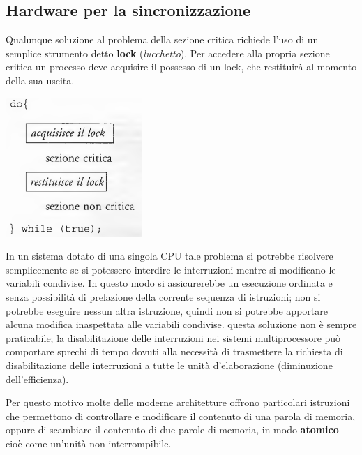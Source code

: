 \documentclass[11pt,a4paper]{article}
\begin{document}
\subsection{Hardware per la sincronizzazione}
Qualunque soluzione al problema della sezione critica richiede l'uso di un semplice strumento detto \textbf{lock} (\emph{lucchetto}).
Per acce­dere alla propria sezione critica un processo deve acquisire il possesso di un lock, che resti­tuirà al momento della sua uscita.
\begin{center}
  \includegraphics[scale=0.6]{img/0023.png}
\end{center}
In un sistema dotato di una singola CPU tale problema si potrebbe risolvere semplicemente se si potessero interdire le interruzioni mentre si modificano le variabili condivise. In questo modo si assicurerebbe un esecuzione ordinata e senza possibilità di prelazione della
corrente sequenza di istruzioni; non si potrebbe eseguire nessun altra istruzione, quindi non
si potrebbe apportare alcuna modifica inaspettata alle variabili condivise. questa soluzione non è sempre praticabile; la disabilitazione delle in­terruzioni nei sistemi multiprocessore può comportare sprechi di tempo dovuti alla necessi­tà di trasmettere la richiesta di disabilitazione delle interruzioni a tutte le unità d'elaborazione (diminuzione dell'efficienza).

Per questo motivo molte delle moderne architetture offrono particolari istruzioni che
permettono di controllare e modificare il contenuto di una parola di memoria, oppure di
scambiare il contenuto di due parole di memoria, in modo \textbf{atomico} - cioè come un'unità
non interrompibile.
\end{document}
